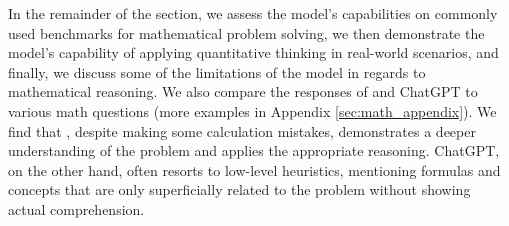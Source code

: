 \iffalse
In the following section, we investigate \DV's mathematical abilities in the following categories:
\begin{enumerate}
\item Solving standard Math problems: The ability of the model to solve a mathematical question. We select problems from the elementary school level, high school level, and more advanced level, and test how \DV \ solves the questions in each level. We argue that \DV \ is already capable of solving \textbf{high-school-level} math questions. 
\item Quantitative reasoning: The ability of the model to build models and use math to solve daily-life questions. We argue that \DV \ is capable of building mathematical models for real-world scenarios, making reasonable assumptions to fill in the missing information.
\item Fundamental mathematical reasoning limitations of \DV.
\end{enumerate}
\fi
In the remainder of the section, we assess the model's capabilities on commonly used benchmarks for mathematical problem solving, we then demonstrate the model's capability of applying quantitative thinking in real-world scenarios, and finally, we discuss some of the limitations of the model in regards to mathematical reasoning. We also compare the responses of {\DV} and ChatGPT to various math questions (more examples in Appendix \ref{sec:math_appendix}). We find that {\DV}, despite making some calculation mistakes, demonstrates a deeper understanding of the problem and applies the appropriate reasoning. ChatGPT, on the other hand, often resorts to low-level heuristics, mentioning formulas and concepts that are only superficially related to the problem without showing actual comprehension.

